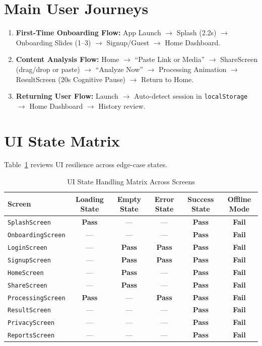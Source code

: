 \documentclass[10pt,a4paper]{report}
\newcommand{\statusPass}{\textcolor{passGreen}{\textbf{Pass}}}
\newcommand{\statusFail}{\textcolor{critRed}{\textbf{Fail}}}
\begin{document}
\section{Main User Journeys}
\begin{enumerate}[leftmargin=1.5em]
    \item \textbf{First-Time Onboarding Flow:} App Launch $\rightarrow$ Splash (2.2s) $\rightarrow$ Onboarding Slides (1--3) $\rightarrow$ Signup/Guest $\rightarrow$ Home Dashboard.
    \item \textbf{Content Analysis Flow:} Home $\rightarrow$ ``Paste Link or Media'' $\rightarrow$ ShareScreen (drag/drop or paste) $\rightarrow$ ``Analyze Now'' $\rightarrow$ Processing Animation $\rightarrow$ ResultScreen (20s Cognitive Pause) $\rightarrow$ Return to Home.
    \item \textbf{Returning User Flow:} Launch $\rightarrow$ Auto-detect session in \texttt{localStorage} $\rightarrow$ Home Dashboard $\rightarrow$ History review.
\end{enumerate}

\section{UI State Matrix}
Table~\ref{tab:ui_states} reviews UI resilience across edge-case states.

\begin{table}[htbp]
\centering
\small
\caption{UI State Handling Matrix Across Screens}
\label{tab:ui_states}
\begin{tabularx}{\textwidth}{l c c c c c}
\toprule
\textbf{Screen} & \textbf{Loading State} & \textbf{Empty State} & \textbf{Error State} & \textbf{Success State} & \textbf{Offline Mode} \\
\midrule
\texttt{SplashScreen} & \statusPass & --- & --- & \statusPass & \statusFail \\
\texttt{OnboardingScreen} & --- & --- & --- & \statusPass & \statusFail \\
\texttt{LoginScreen} & --- & \statusPass & \statusPass & \statusPass & \statusFail \\
\texttt{SignupScreen} & --- & \statusPass & \statusPass & \statusPass & \statusFail \\
\texttt{HomeScreen} & --- & \statusPass & --- & \statusPass & \statusFail \\
\texttt{ShareScreen} & --- & \statusPass & --- & \statusPass & \statusFail \\
\texttt{ProcessingScreen} & \statusPass & --- & \statusPass & \statusPass & \statusFail \\
\texttt{ResultScreen} & --- & --- & --- & \statusPass & \statusFail \\
\texttt{PrivacyScreen} & --- & --- & --- & \statusPass & \statusFail \\
\texttt{ReportsScreen} & --- & --- & --- & \statusPass & \statusFail \\
\bottomrule
\end{tabularx}
\end{table}
\end{document}
